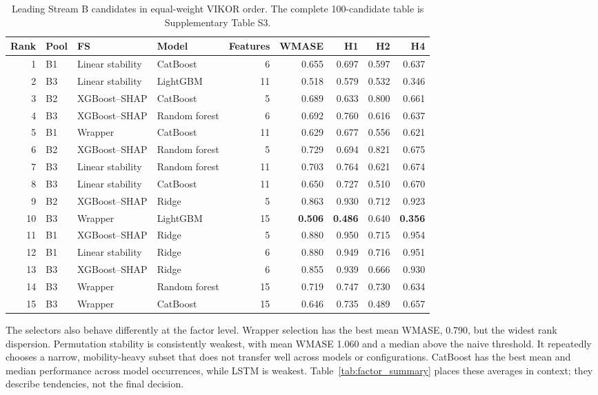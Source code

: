 \documentclass[preprint,12pt]{elsarticle}
\begin{document}
\begin{table}[!htbp]
\centering
\caption{Leading Stream B candidates in equal-weight VIKOR order. The complete 100-candidate table is Supplementary Table S3.}
\label{tab:streamB}
\footnotesize
\begin{adjustbox}{max width=\textwidth}
\begin{tabular}{@{}rlllrrrrr@{}}
\toprule
Rank & Pool & FS & Model & Features & WMASE & H1 & H2 & H4 \\
\midrule
1 & B1 & Linear stability & CatBoost & 6 & 0.655 & 0.697 & 0.597 & 0.637 \\
2 & B3 & Linear stability & LightGBM & 11 & 0.518 & 0.579 & 0.532 & 0.346 \\
3 & B2 & XGBoost--SHAP & CatBoost & 5 & 0.689 & 0.633 & 0.800 & 0.661 \\
4 & B3 & XGBoost--SHAP & Random forest & 6 & 0.692 & 0.760 & 0.616 & 0.637 \\
5 & B1 & Wrapper & CatBoost & 11 & 0.629 & 0.677 & 0.556 & 0.621 \\
6 & B2 & XGBoost--SHAP & Random forest & 5 & 0.729 & 0.694 & 0.821 & 0.675 \\
7 & B3 & Linear stability & Random forest & 11 & 0.703 & 0.764 & 0.621 & 0.674 \\
8 & B3 & Linear stability & CatBoost & 11 & 0.650 & 0.727 & 0.510 & 0.670 \\
9 & B2 & XGBoost--SHAP & Ridge & 5 & 0.863 & 0.930 & 0.712 & 0.923 \\
10 & B3 & Wrapper & LightGBM & 15 & \textbf{0.506} & \textbf{0.486} & 0.640 & \textbf{0.356} \\
11 & B1 & XGBoost--SHAP & Ridge & 5 & 0.880 & 0.950 & 0.715 & 0.954 \\
12 & B1 & Linear stability & Ridge & 6 & 0.880 & 0.949 & 0.716 & 0.951 \\
13 & B3 & XGBoost--SHAP & Ridge & 6 & 0.855 & 0.939 & 0.666 & 0.930 \\
14 & B3 & Wrapper & Random forest & 15 & 0.719 & 0.747 & 0.730 & 0.634 \\
15 & B3 & Wrapper & CatBoost & 15 & 0.646 & 0.735 & 0.489 & 0.657 \\
\bottomrule
\end{tabular}
\end{adjustbox}
\end{table}

The selectors also behave differently at the factor level. Wrapper selection has the best mean WMASE, 0.790, but the widest rank dispersion. Permutation stability is consistently weakest, with mean WMASE 1.060 and a median above the naive threshold. It repeatedly chooses a narrow, mobility-heavy subset that does not transfer well across models or configurations. CatBoost has the best mean and median performance across model occurrences, while LSTM is weakest. Table~\ref{tab:factor_summary} places these averages in context; they describe tendencies, not the final decision.
\end{document}
